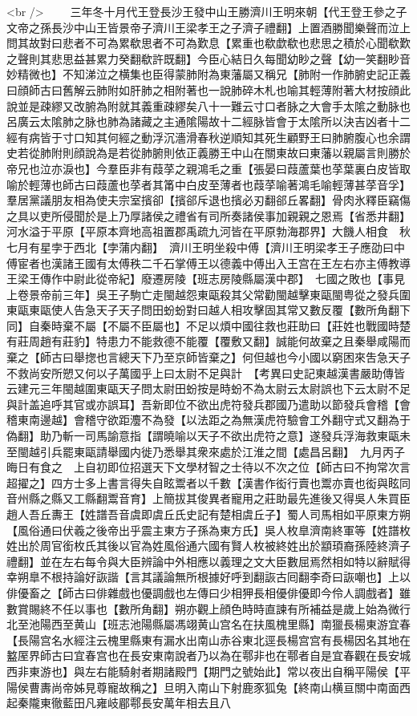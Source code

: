 <br />
　　三年冬十月代王登長沙王發中山王勝濟川王明來朝【代王登王參之子文帝之孫長沙中山王皆景帝子濟川王梁孝王之子濟子禮翻】上置酒勝聞樂聲而泣上問其故對曰悲者不可為累欷思者不可為歎息【累重也欷歔欷也悲思之積於心聞欷歎之聲則其悲思益甚累力癸翻欷許既翻】今臣心結日久每聞幼眇之聲【幼一笑翻眇音妙精微也】不知涕泣之横集也臣得蒙肺附為東藩屬又稱兄【肺附一作肺腑史記正義曰顔師古曰舊解云肺附如肝肺之相附著也一說肺碎木札也喻其輕薄附著大材按顔此說並是疎繆又改腑為附就其義重疎繆矣八十一難云寸口者脉之大會手太隂之動脉也呂廣云太隂肺之脉也肺為諸藏之主通隂陽故十二經脉皆會于太隂所以決吉凶者十二經有病皆于寸口知其何經之動浮沉濇滑春秋逆順知其死生顧野王曰肺腑腹心也余謂史若從肺附則顔說為是若從肺腑則依正義勝王中山在關東故曰東藩以親屬言則勝於帝兄也泣亦淚也】今羣臣非有葭莩之親鴻毛之重【張晏曰葭蘆葉也莩葉裏白皮皆取喻於輕薄也師古曰葭蘆也莩者其筩中白皮至薄者也葭莩喻著鴻毛喻輕薄甚莩音孚】羣居黨議朋友相為使夫宗室擯卻【擯郤斥退也擯必刃翻郤丘畧翻】骨肉氷釋臣竊傷之具以吏所侵聞於是上乃厚諸侯之禮省有司所奏諸侯事加親親之恩焉【省悉井翻】　河水溢于平原【平原本齊地高祖置郡禹疏九河皆在平原勃海郡界】大饑人相食　秋七月有星孛于西北【孛蒲内翻】　濟川王明坐殺中傅【濟川王明梁孝王子應劭曰中傅宦者也漢諸王國有太傅秩二千石掌傅王以德義中傅出入王宫在王左右亦主傅教導王梁王傳作中尉此從帝紀】廢遷房陵【班志房陵縣屬漢中郡】　七國之敗也【事見上卷景帝前三年】吳王子駒亡走閩越怨東甌殺其父常勸閩越擊東甌閩粤從之發兵圍東甌東甌使人告急天子天子問田蚡蚡對曰越人相攻擊固其常又數反覆【數所角翻下同】自秦時棄不屬【不屬不臣屬也】不足以煩中國往救也莊助曰【莊姓也戰國時楚有莊周趙有莊豹】特患力不能救德不能覆【覆敷又翻】誠能何故棄之且秦舉咸陽而棄之【師古曰舉揔也言總天下乃至京師皆棄之】何但越也今小國以窮困來吿急天子不救尚安所愬又何以子萬國乎上曰太尉不足與計　【考異曰史記東越漢書嚴助傳皆云建元三年閩越圍東甌天子問太尉田蚡按是時蚡不為太尉云太尉誤也下云太尉不足與計盖追呼其官或亦誤耳】吾新即位不欲出虎符發兵郡國乃遣助以節發兵會稽【會稽東南邊越】會稽守欲距灋不為發【以法距之為無漢虎符驗會工外翻守式又翻為于偽翻】助乃斬一司馬諭意指【謂曉喻以天子不欲出虎符之意】遂發兵浮海救東甌未至閩越引兵罷東甌請舉國内徙乃悉舉其衆來處於江淮之間【處昌呂翻】　九月丙子晦日有食之　上自初即位招選天下文學材智之士待以不次之位【師古曰不拘常次言超擢之】四方士多上書言得失自眩鬻者以千數【漢書作衒行賣也鬻亦賣也衒與眩同音州縣之縣又工縣翻鬻音育】上簡拔其俊異者寵用之莊助最先進後又得吳人朱買臣趙人吾丘夀王【姓譜吾音虞即虞丘氏史記有楚相虞丘子】蜀人司馬相如平原東方朔【風俗通曰伏羲之後帝出乎震主東方子孫為東方氏】吳人枚臯濟南終軍等【姓譜枚姓出於周官銜枚氏其後以官為姓風俗通六國有賢人枚被終姓出於顓頊裔孫陸終濟子禮翻】並在左右每令與大臣辨論中外相應以義理之文大臣數屈焉然相如特以辭賦得幸朔臯不根持論好詼諧【言其議論無所根據好呼到翻詼古囘翻李奇曰詼嘲也】上以俳優畜之【師古曰俳雜戲也優調戲也左傳曰少相狎長相優俳優即今伶人調戲者】雖數賞賜終不任以事也【數所角翻】朔亦觀上顔色時時直諫有所補益是歲上始為微行北至池陽西至黄山【班志池陽縣屬馮翊黄山宫名在扶風槐里縣】南獵長楊東游宜春【長陽宫名水經注云槐里縣東有漏水出南山赤谷東北逕長楊宫宫有長楊因名其地在盭厔界師古曰宜春宫也在長安東南說者乃以為在鄠非也在鄠者自是宜春觀在長安城西非東游也】與左右能騎射者期諸殿門【期門之號始此】常以夜出自稱平陽侯【平陽侯曹夀尚帝姊見尊寵故稱之】旦明入南山下射鹿豕狐兔【終南山横亘關中南面西起秦隴東徹藍田凡雍岐郿鄠長安萬年相去且八